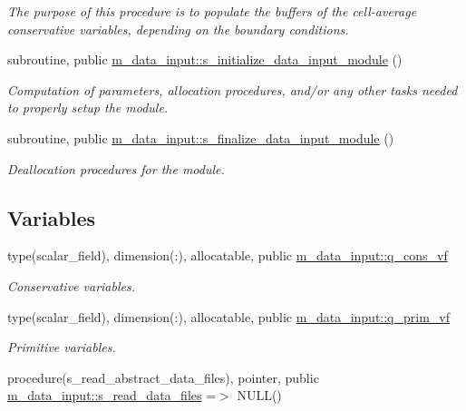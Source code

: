 \begin{DoxyCompactItemize}
\begin{DoxyCompactList}\small\item\em The purpose of this procedure is to populate the buffers of the cell-\/average conservative variables, depending on the boundary conditions. \end{DoxyCompactList}\item 
subroutine, public \hyperlink{namespacem__data__input_a806c2edb19d6a47fd494f8491d2b93d3}{m\+\_\+data\+\_\+input\+::s\+\_\+initialize\+\_\+data\+\_\+input\+\_\+module} ()
\begin{DoxyCompactList}\small\item\em Computation of parameters, allocation procedures, and/or any other tasks needed to properly setup the module. \end{DoxyCompactList}\item 
subroutine, public \hyperlink{namespacem__data__input_aa29d4a799cd1c1cd7d0f05f05f42abe0}{m\+\_\+data\+\_\+input\+::s\+\_\+finalize\+\_\+data\+\_\+input\+\_\+module} ()
\begin{DoxyCompactList}\small\item\em Deallocation procedures for the module. \end{DoxyCompactList}\end{DoxyCompactItemize}
\subsection*{Variables}
\begin{DoxyCompactItemize}
\item 
type(scalar\+\_\+field), dimension(\+:), allocatable, public \hyperlink{namespacem__data__input_a464b144d544f769a0d9a1b549c510e1f}{m\+\_\+data\+\_\+input\+::q\+\_\+cons\+\_\+vf}
\begin{DoxyCompactList}\small\item\em Conservative variables. \end{DoxyCompactList}\item 
type(scalar\+\_\+field), dimension(\+:), allocatable, public \hyperlink{namespacem__data__input_a65ba499d27d4b21b1ec8bcfe02816bd4}{m\+\_\+data\+\_\+input\+::q\+\_\+prim\+\_\+vf}
\begin{DoxyCompactList}\small\item\em Primitive variables. \end{DoxyCompactList}\item 
procedure(s\+\_\+read\+\_\+abstract\+\_\+data\+\_\+files), pointer, public \hyperlink{namespacem__data__input_aba1cbfb151ed869483feb37291104830}{m\+\_\+data\+\_\+input\+::s\+\_\+read\+\_\+data\+\_\+files} =$>$ N\+U\+LL()
\end{DoxyCompactItemize}


